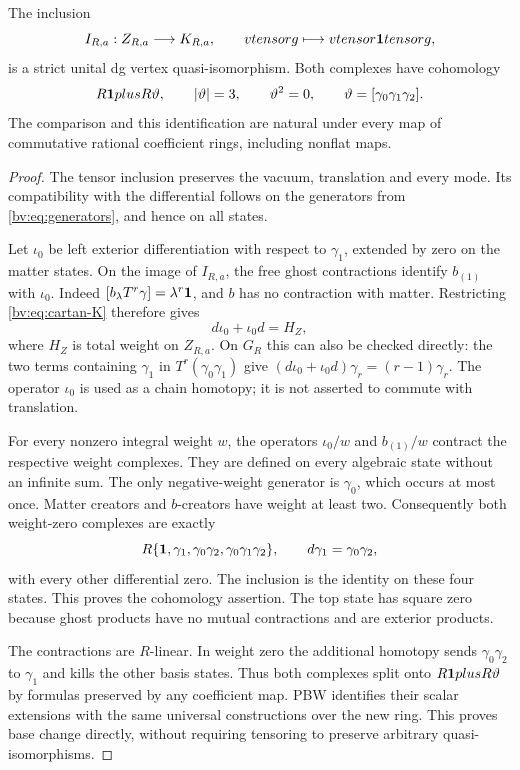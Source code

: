 \begin{theorem}\label{bv:thm:inclusion}
The inclusion
\begin{equation}\label{bv:eq:inclusion}
 I_{R,a}:Z_{R,a}\longrightarrow K_{R,a},
 \qquad vtensor g\longmapsto vtensor\mathbf{1}tensor g,
\end{equation}
is a strict unital dg vertex quasi-isomorphism.  Both complexes have
cohomology
\[
 R\mathbf{1}plus R\vartheta,
 \qquad |\vartheta|=3,\qquad \vartheta^2=0,\qquad
 \vartheta=[\gamma_0\gamma_1\gamma_2].
\]
The comparison and this identification are natural under every map
of commutative rational coefficient rings, including nonflat maps.
\end{theorem}

\begin{proof}
The tensor inclusion preserves the vacuum, translation and every mode.
Its compatibility with the differential follows on the generators
from \eqref{bv:eq:generators}, and hence on all states.

Let \(\iota_0\) be left exterior differentiation with respect to
\(\gamma_1\), extended by zero on the matter states.  On the image
of \(I_{R,a}\), the free ghost contractions identify \(b_{(1)}\)
with \(\iota_0\).  Indeed
\([b_\lambda T^r\gamma]=\lambda^r\mathbf{1}\), and \(b\) has no
contraction with matter.  Restricting \eqref{bv:eq:cartan-K} therefore
gives
\[
 d\iota_0+\iota_0d=H_Z,
\]
where \(H_Z\) is total weight on \(Z_{R,a}\).  On \(G_R\) this can
also be checked directly: the two terms containing \(\gamma_1\)
in \(T^r(\gamma_0\gamma_1)\) give
\((d\iota_0+\iota_0d)\gamma_r=(r-1)\gamma_r\).
The operator \(\iota_0\) is used as a chain homotopy; it is not
asserted to commute with translation.

For every nonzero integral weight \(w\), the operators
\(\iota_0/w\) and \(b_{(1)}/w\) contract the respective weight
complexes.  They are defined on every algebraic state without an
infinite sum.  The only negative-weight generator is \(\gamma_0\),
which occurs at most once.  Matter creators and \(b\)-creators have
weight at least two.  Consequently both weight-zero complexes are
exactly
\begin{equation}\label{bv:eq:four-states}
 R\{\mathbf{1},\gamma_1,\gamma_0\gamma_2,
                         \gamma_0\gamma_1\gamma_2\},
 \qquad d\gamma_1=\gamma_0\gamma_2,
\end{equation}
with every other differential zero.  The inclusion is the identity
on these four states.  This proves the cohomology assertion.  The top
state has square zero because ghost products have no mutual
contractions and are exterior products.

The contractions are \(R\)-linear.  In weight zero the additional
homotopy sends \(\gamma_0\gamma_2\) to \(\gamma_1\) and kills the
other basis states.  Thus both complexes split onto
\(R\mathbf{1}plus R\vartheta\) by formulas preserved by any coefficient
map.  PBW identifies their scalar extensions with the same universal
constructions over the new ring.  This proves base change directly,
without requiring tensoring to preserve arbitrary quasi-isomorphisms.
\end{proof}

